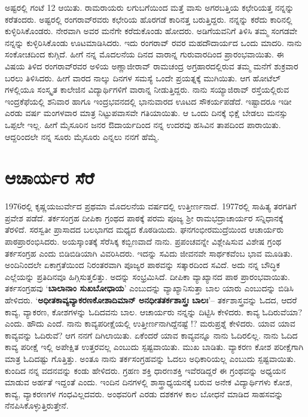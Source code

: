 {ಅಷ್ಟರಲ್ಲಿ ಗಂಟೆ 12 ಆಯಿತು.  ರಾಮರಾಯರು ಲಗುಬಗೆಯಿಂದ ಮತ್ತೆ ವಾಸು ಅಗರಬತ್ತಿಯ ಕಛೇರಿಯತ್ತ ನನ್ನನ್ನು ಕರೆತಂದರು.  ಅಷ್ಟರಲ್ಲಿ ರಂಗರಾವ್‍ರವರು ಕಛೇರಿಯ ಹೊರಗಡೆ ಕಾರಿನತ್ತ ಬರುತ್ತಿದ್ದರು.  ನನ್ನನ್ನು ಕರೆದು ಕಾರಿನಲ್ಲಿ ಕುಳ್ಳಿರಿಸಿಕೊಂಡರು.  ನೇರವಾಗಿ ಅವರ ಮನೆಗೇ ಕರೆದುಕೊಂಡು ಹೋದರು.  ಅಡಿಗೆಯವನಿಗೆ ತಿಳಿಸಿ ತಮ್ಮ ಸಂಗಡವೇ ನನ್ನನ್ನು ಕುಳ್ಳಿರಿಸಿಕೊಂಡು ಊಟಮಾಡಿಸಿದರು.  ಇದು ರಂಗರಾವ್ ರವರ ಮಹದೌದಾರ್ಯದ ಒಂದು ಮಾದರಿ.  ನಾನು ಸಂಕೋಚದಿಂದ ಕುಗ್ಗಿದೆ.  ಹೀಗೆ ನನ್ನ ಮೊದಲನೆಯ ದಿನದ ವಾರಾನ್ನ ಗುರುವಾರದಿಂದ ಪ್ರಾರಂಭವಾಯಿತು. ಈ ವಿಷಯ ತಿಳಿದ ರಂಗರಾವ್‍ರವರ ಅಳಿಯ ಅಣ್ಣಾಜೀರಾವ್ ರಾಮಚಂದ್ರ ಅಗ್ರಹಾರದಲ್ಲಿರುವ ತಮ್ಮ ಮನೆಗೆ ಶುಕ್ರವಾರ ಬರಲು ತಿಳಿಸಿದರು.  ಹೀಗೆ ವಾರದ ನಾಲ್ಕು ದಿನಗಳ ಸಮಸ್ಯೆ ಒಂದೇ ಪ್ರಯತ್ನಕ್ಕೆ ಮುಗಿಯಿತು.  ಆಗ ಹೋಟೆಲ್ ಗಳಲ್ಲಿಯೂ ಸಂಸ್ಕೃತ ಕಾಲೇಜಿನ ವಿದ್ಯಾರ್ಥಿಗಳಿಗೆ ವಾರಾನ್ನ ನೀಡುತ್ತಿದ್ದರು.  ನಾನು ಸಯ್ಯಾಜಿರಾವ್ ರಸ್ತೆಯಲ್ಲಿರುವ ಇಂದ್ರಕೆಫೆಯಲ್ಲಿ ಶನಿವಾರ ಹಾಗೂ ಇಂದ್ರಭವನದಲ್ಲಿ ಭಾನುವಾರದ ಊಟದ ಸೌಕರ್ಯಪಡೆದೆ.  ಇಷ್ಟಾದರೂ ಇಡೀ ಎರಡು ವರ್ಷ ಮಂಗಳವಾರ ಮಾತ್ರ ನಿಟ್ಟುಪವಾಸವೇ ಗತಿಯಾಯಿತು.  ಆ ಒಂದು ದಿನಕ್ಕೆ ಭಿಕ್ಷೆ ಬೇಡಲು ಮನಸ್ಸು ಒಪ್ಪಲೇ ಇಲ್ಲ.  ಹೀಗೆ ಮೈಸೂರಿನ ಜನರ ಔದಾರ್ಯದಿಂದ ನನ್ನ ಉದರವು ಹಸಿವಿನ ತಾಪದಿಂದ ಪಾರಾಯಿತು.  ಆದ್ದರಿಂದಲೇ ನನ್ನ ಸೂರು ಮೈಸೂರು ಎನ್ನಲು ನನಗೆ ಹೆಮ್ಮೆ.

\section*{ಆಚಾರ್ಯರ ಸೆರೆ}

1976ರಲ್ಲಿ  ಕೃಷ್ಣಯಜುರ್ವೇದ ಪ್ರಥಮಾ ಮೊದಲನೆಯ ವರ್ಷದಲ್ಲಿ ಉತ್ತೀರ್ಣನಾದೆ.  1977ರಲ್ಲಿ ಸಾಹಿತ್ಯ ತರಗತಿಗೆ ಪ್ರವೇಶ ಪಡೆದೆ.  ತರ್ಕಸಂಗ್ರಹ ದೀಪಿಕಾ ಗ್ರಂಥದ ಪಾಠಕ್ಕೆ ಪರಮ ಪೂಜ್ಯ ಶ್ರೀ ರಾಮಭದ್ರಾಚಾರ್ಯರ ಸನ್ನಿಧಾನಕ್ಕೆ ತೆರಳಿದೆ.  ಸರಸ್ವತೀ ಪ್ರಾಸಾದದ ಬಲಭಾಗದ ಮಧ್ಯದ ಕೊಠಡಿಯಿದು.  ಘನಗಂಭೀರಮುದ್ರೆಯಿಂದ ಆಚಾರ್ಯರು ಪಾಠಪ್ರಾರಂಭಿಸಿದರು.  ಅಯಸ್ಕಾಂತಕ್ಕೆ ಸೆರೆಸಿಕ್ಕ ಕಬ್ಬಿಣವಾದೆ ನಾನು.  ಪ್ರಪಂಚವನ್ನೇ ವಿಶ್ಲೇಷಿಸುವ ವಿಶೇಷ ಗ್ರಂಥ ತರ್ಕಸಂಗ್ರಹ ಎಂದು ಬಿಡಿಬಿಡಿಯಾಗಿ ವಿವರಿಸಿದರು. ಇದನ್ನು ಸವಿದು ಜೀವನವೇ ಸಾರ್ಥಕವೆಂಬ ಭಾವ ಮೂಡಿತು.  ಅಂದಿನಿಂದಲೇ ಏಕಾಗ್ರತೆಯಿಂದ ನಿರಂತರವಾಗಿ ಪೂಜ್ಯರ ಪಾಠವನ್ನು ಸತ್ಕಾರದಿಂದ ಸವಿದೆ.  ಅದು ನನ್ನ ಬೌದ್ಧಿಕ ಎಲ್ಲೆಯನ್ನು ಪ್ರತಿದಿನವೂ ಹಿಗ್ಗಿಸುತ್ತಲಿತ್ತು.  ಅದನ್ನು ಸಂಭ್ರಮಿಸಿದೆ.  ದೀಪಿಕಾ ವ್ಯಾಖ್ಯಾನದ ಪಾಠ ಪ್ರಾರಂಭವಾಯಿತು. ತರ್ಕಸಂಗ್ರಹವು ‘\textbf{ಬಾಲಾನಾಂ ಸುಖಬೋಧಾಯ}’ ಎಂಬುದನ್ನು ವ್ಯಾಖ್ಯಾನಿಸುತ್ತಾ ಬಾಲ ಯಾರು ಎಂಬುದನ್ನು ಬಿಡಿಸಿ ಹೇಳಿದರು.  ‘\textbf{ಅಧೀತಕಾವ್ಯವ್ಯಾಕರಣಕೋಶಾದಿಮಾನ್ ಅನಧೀತತರ್ಕಶಾಸ್ತ್ರಃ ಬಾಲಃ}’– ತರ್ಕಶಾಸ್ತ್ರವನ್ನು ಓದದ, ಆದರೆ ಕಾವ್ಯ, ವ್ಯಾಕರಣ, ಕೋಶಗಳನ್ನು ಓದಿದವನು ಬಾಲ.  ಆಚಾರ್ಯರು ನನ್ನನ್ನು ದಿಟ್ಟಿಸಿ ಕೇಳಿದರು.  ಕಾವ್ಯ ಓದಿರುವೆಯಾ? ಎಂದು.  ಹೌದು ಎಂದೆ.  ನಾನು ಕಾವ್ಯಪರೀಕ್ಷೆಯಲ್ಲಿ ಉತ್ತೀರ್ಣನಾಗಿದ್ದೆನಷ್ಟೆ !?  ಮರುಪ್ರಶ್ನೆ ಕೇಳಿದರು.  ಯಾವ ಯಾವ ಕಾವ್ಯವನ್ನು ಓದಿರುವೆ?  ಆಗ ನನಗೆ ದಿಗಿಲಾಯಿತು.  ಏಕೆಂದರೆ ಯಾವ ಕಾವ್ಯವನ್ನೂ ನಾನು ಓದಿರಲಿಲ್ಲ.  ನಾನು ಓದಿದ ಕಾವ್ಯ ಪರೀಕ್ಷೆ ಇಲ್ಲಿ ಅಪೇಕ್ಷಿತ ಉತ್ತರವಲ್ಲ ಎಂಬುದು ಸ್ಪಷ್ಟವಾಯಿತು.  ಮುಖ ಬಾಡಿತು.  ವ್ಯಾಕರಣ ಕೋಶ ಪರೀಕ್ಷೆಗಾಗಿ ಮಾತ್ರ ಓದಿದಷ್ಟು ಗೊತ್ತಿತ್ತು. ಅಂತೂ ನಾನು ತರ್ಕಸಂಗ್ರಹವನ್ನು ಓದಲು ಅಧಿಕಾರಿಯಲ್ಲ ಎಂಬುದು ಸ್ಪಷ್ಟವಾಯಿತು.  ಕುಂದಿದ ನನ್ನ ವದನವನ್ನು ಕಂಡು ಹೇಳಿದರು.  ಗ್ರಹಣ ಶಕ್ತಿ ಧಾರಣಶಕ್ತಿ ಇವೆರಡಿದ್ದರೆ ಈ ಗ್ರಂಥವನ್ನು ಅಧ್ಯಯನ ಮಾಡುವ ಅರ್ಹತೆ ಇದ್ದಂತೆ ಎಂದು.  ಇಂದಿನ ದಿನಗಳಲ್ಲಿ ಶಾಸ್ತ್ರಾಧ್ಯಯನಕ್ಕೆ ಬರುವ ಅನೇಕ ವಿದ್ಯಾರ್ಥಿಗಳು ಕೋಶ, ಕಾವ್ಯ, ವ್ಯಾಕರಣಗಳ ಗಂಧವಿಲ್ಲದವರು.  ಅಂಥವರಿಗೆ ಎರಡು ದಶಕಗಳ ಕಾಲ ಬೋಧನೆ ಮಾಡಿದ ಸಾಹಸವನ್ನು ನೆನಪಿಸಿಕೊಳ್ಳುತ್ತಿರುತ್ತೇನೆ.    

}
